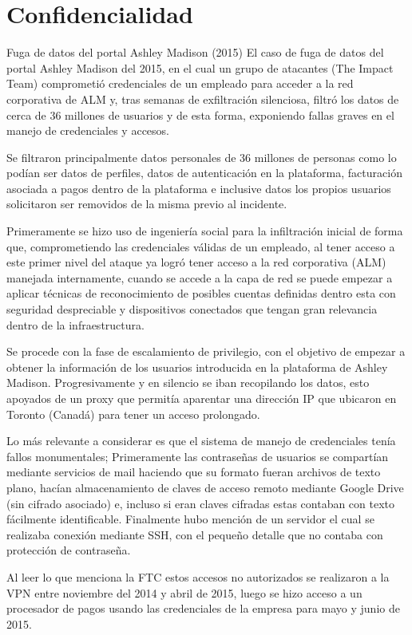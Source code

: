 \section{Confidencialidad}

\begin{caso}{Fuga de datos del portal Ashley Madison (2015)}
  El caso de fuga de datos del portal Ashley Madison del 2015, en el cual un grupo de atacantes (The Impact Team) comprometió credenciales de un empleado para acceder a la red corporativa de ALM y, tras semanas de exfiltración silenciosa, filtró los datos de cerca de 36 millones de usuarios y de esta forma, exponiendo fallas graves en el manejo de credenciales y accesos.
\end{caso}

\begin{respuesta}Se filtraron principalmente datos personales de 36 millones de personas como lo podían ser datos de perfiles, datos de autenticación en la plataforma, facturación asociada a pagos dentro de la plataforma e inclusive datos los propios usuarios solicitaron ser removidos de la misma previo al incidente.\end{respuesta}

\begin{respuesta}
  Primeramente se hizo uso de ingeniería social para la infiltración inicial de forma que, comprometiendo las credenciales válidas de un empleado, al tener acceso a este primer nivel del ataque ya logró tener acceso a la red corporativa (ALM) manejada internamente, cuando se accede a la capa de red se puede empezar a aplicar técnicas de reconocimiento de posibles cuentas definidas dentro esta con seguridad despreciable y dispositivos conectados que tengan gran relevancia dentro de la infraestructura.

  Se procede con la fase de escalamiento de privilegio, con el objetivo de empezar a obtener la información de los usuarios introducida en la plataforma de Ashley Madison. Progresivamente y en silencio se iban recopilando los datos, esto apoyados de un proxy que permitía aparentar una dirección IP que ubicaron en Toronto (Canadá) para tener un acceso prolongado.

  Lo más relevante a considerar es que el sistema de manejo de credenciales tenía fallos monumentales; Primeramente las contraseñas de usuarios se compartían mediante servicios de mail haciendo que su formato fueran archivos de texto plano, hacían almacenamiento de claves de acceso remoto mediante Google Drive (sin cifrado asociado) e, incluso si eran claves cifradas estas contaban con texto fácilmente identificable. Finalmente hubo mención de un servidor el cual se realizaba conexión mediante SSH, con el pequeño detalle que no contaba con protección de contraseña.

  Al leer lo que menciona la FTC estos accesos no autorizados se realizaron a la VPN entre noviembre del 2014 y abril de 2015, luego se hizo acceso a un procesador de pagos usando las credenciales de la empresa para mayo y junio de 2015.
\end{respuesta}

